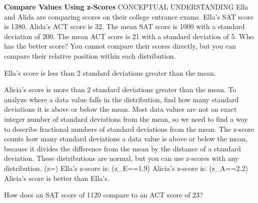 \documentclass{article}
\newenvironment{example}[1]{}{}         %
\newenvironment{tryit}[1]{}{}           %
\newcommand{\answer}[1]{}               %
\newcommand{\placeholder}[2]{}          %
\newcommand{\te}[1]{}                   %
\begin{document}
\begin{example}{3}
\textbf{Compare Values Using z-Scores}
CONCEPTUAL UNDERSTANDING
Ella and Alida are comparing scores on their college entrance exams. Ella's SAT score is 1380. Alida's ACT score is 32. The mean SAT score is 1000 with a standard deviation of 200. The mean ACT score is 21 with a standard deviation of 5. Who has the better score?
You cannot compare their scores directly, but you can compare their relative position within each distribution.
\placeholder{graph}{Distribution of SAT Scores. Red normal curve centered at 1000; horizontal labels 400,600,800,1000,1200,1400,1600. Red vertical at mean and short marker near 1380. Vertical guides, no vertical scale or arrows.}
Ella's score is less than 2 standard deviations greater than the mean.
\placeholder{graph}{Distribution of ACT Scores. Blue normal curve centered at 21; horizontal labels 0,5,10,15,20,25,30,35,40. Blue vertical at 21, short marker near 32, vertical guides. No vertical scale or arrows.}
Alicia's score is more than 2 standard deviations greater than the mean.
To analyze where a data value falls in the distribution, find how many standard deviations it is above or below the mean. Most data values are not an exact integer number of standard deviations from the mean, so we need to find a way to describe fractional numbers of standard deviations from the mean.
The z-score counts how many standard deviations a data value is above or below the mean, because it divides the difference from the mean by the distance of a standard deviation. These distributions are normal, but you can use z-scores with any distribution.
(z=)
Ella's z-score is: (z_E==1.9)
Alicia's z-score is: (z_A==2.2)
Alicia's score is better than Ella's.
\te{Callout: Ella's score: 1380; Mean SAT score: 1000; Standard deviation of scores: 200.}
\te{Callout: Alida's score: 32; Mean ACT score: 21; Standard deviation of scores: 5.}
\answer{Alicia's score is better than Ella's; (z_E=1.9), (z_A=2.2).}
\te{Printed Alicia in the worked solution; the prompt and callout name Alida.}
\te{COMMON ERROR You may think that a positive z-score is always better than a negative one. Be careful to consider the context, though. Test scores: higher is better; Golf scores: lower is better; Height: no “better” score.}
\end{example}
\begin{tryit}{3}
How does an SAT score of 1120 compare to an ACT score of 23?
\answer{An SAT score of 1120 represents (z=0.6), and an ACT score of 23 represents (z=0.4); the SAT is the better score.}
\end{tryit}
\end{document}
